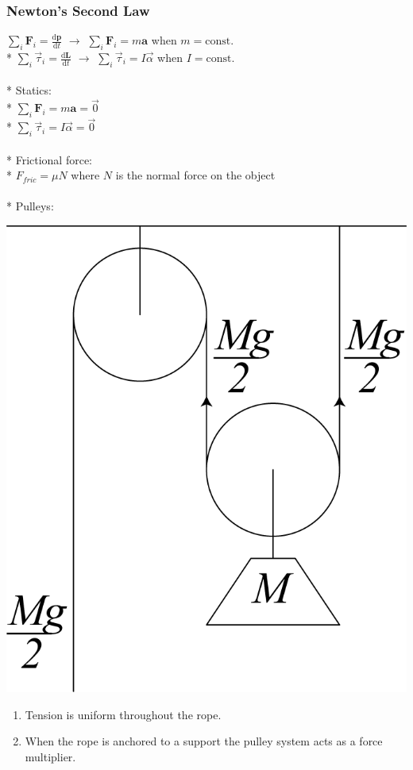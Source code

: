 \subsubsection{Newton's Second Law}
\( \displaystyle\sum_{i}\mathbf{F_{\mathit{i}}}=\frac{\mathrm{d}\mathbf{p}}{\mathrm{d}t} \) \(\to\) \( \displaystyle\sum_{i}\mathbf{F_{\mathit{i}}}=m\mathbf{a} \) when \(\mathit{m} = \mathrm{const.}\)\\*
\( \displaystyle\sum_{i}\vec{\tau}_{\mathit{i}}=\frac{\mathrm{d}\mathbf{L}}{\mathrm{d}t} \) \(\to\) \( \displaystyle\sum_{i}\vec{\tau}_{\mathit{i}}=I\vec{\alpha} \) when \(I = \mathrm{const.}\)\\\\*
Statics:\\*
\( \displaystyle\sum_{i}\mathbf{F_{\mathit{i}}}=m\mathbf{a} =\vec{0}\)\\*
\( \displaystyle\sum_{i}\vec{\tau}_{\mathit{i}}=I\vec{\alpha} =\vec{0}\)\\\\*
Frictional force:\\*
\( F_{fric}=\mu N \)  where \(N\) is the normal force on the object\\\\*
Pulleys:
\begin{center}
\includegraphics[scale=0.5]{images/PGRE_Figures_1p1p4_Pulleys.png}
\end{center}
\begin{enumerate}
\item Tension is uniform throughout the rope.
\item When the rope is anchored to a support the pulley system acts as a force multiplier.
\end{enumerate}

